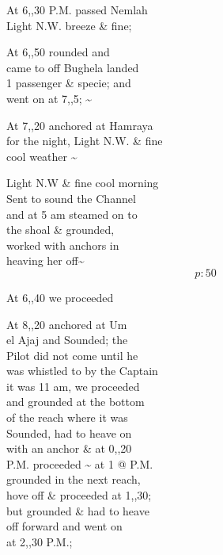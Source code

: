 \documentclass{report}
\begin{document}
	\par{
 	At 6,,30 P.M. passed Nemlah\ \\Light N.W. breeze \& fine;\ \\
	}

	\par{
 	At 6,,50 rounded and\ \\came to off Bughela landed\ \\1 passenger \& specie; and\ \\went on at 7,,5; \~{}\ \\
	}

	\par{
 	At 7,,20 anchored at Hamraya\ \\for the night, Light N.W. \& fine\ \\cool weather \~{}\ \\
	}

	\par{
 	Light N.W \& fine cool morning\ \\Sent to sound the Channel\ \\and at 5 am steamed on to\ \\the shoal \& grounded,\ \\worked with anchors in\ \\heaving her off\~{}\ \\
  \[p: 50 \]

	}

	\par{
 	At 6,,40 we proceeded\ \\
	}

	\par{
 	At 8,,20 anchored at Um\ \\el Ajaj and Sounded; the\ \\Pilot did not come until he\ \\was whistled to by the Captain\ \\it was 11 am, we proceeded\ \\and grounded at the bottom\ \\of the reach where it was\ \\Sounded, had to heave on\ \\with an anchor \& at 0,,20\ \\P.M. proceeded \~{} at 1 @ P.M.\ \\grounded in the next reach,\ \\hove off \& proceeded at 1,,30;\ \\but grounded \& had to heave\ \\off forward and went on\ \\at 2,,30 P.M.;\ \\
	}
\end{document}
